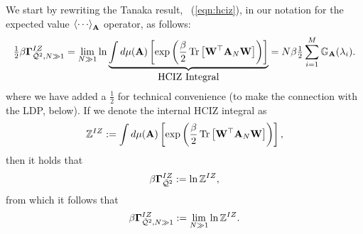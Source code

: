 We start by rewriting the Tanaka result, \EQN~(\ref{eqn:hciz}),
in our notation for the expected value $\Expected[\AMAT]{\cdots}$ operator, as follows:
\begin{equation}
\label{eqn:hciz2}
  \tfrac{1}{2}\beta\mathbf{\Gamma}^{IZ}_{\bar{\mathcal{Q}}^{2},N\gg 1} = \lim_{N\gg 1} \ln \underbrace{ \int d\mu(\mathbf{\mathbf{A}})\left[\exp\left(\frac{\beta}{2}\mbox{}\operatorname{Tr}\left[\mathbf{W}^{\top}\mathbf{A}_N\mathbf{W}\right]\right)\right] }_{\mbox{HCIZ Integral}} 
  = N\beta\tfrac{1}{2}\sum_{i=1}^{M}\mathbb{G}_{\mathbf{A}}(\lambda_{i})   .
\end{equation}
where we have added a $\tfrac{1}{2}$ for technical convenience (to make the connection with the LDP, below).
If we denote the internal HCIZ integral as 
\begin{equation}
\label{eqn:hciz_def}
  \mathbb{Z}^{IZ} := \int d\mu(\mathbf{\mathbf{A}})\left[\exp\left(\frac{\beta}{2}\mbox{}\operatorname{Tr}\left[\mathbf{W}^{\top}\mathbf{A}_N\mathbf{W}\right]\right)\right]  ,
 \end{equation}
then it holds that %
\begin{equation}
  \label{eqn:hciz_def2}
  \beta\mathbf{\Gamma}^{IZ}_{\bar{\mathcal{Q}}^{2}} :=  \ln\mathbb{Z}^{IZ}  ,
\end{equation}
from which it follows that %
\begin{equation}
\label{eqn:hciz_def3}
  \beta\mathbf{\Gamma}^{IZ}_{\bar{\mathcal{Q}}^{2},N\gg 1} := \lim_{N \gg 1} \ln\mathbb{Z}^{IZ}  .
\end{equation}
